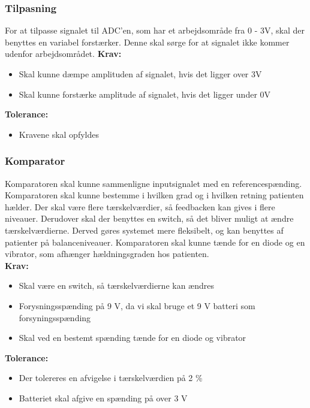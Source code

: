 \subsubsection{Tilpasning}
For at tilpasse signalet til ADC'en, som har et arbejdsområde fra 0 - 3V, skal der benyttes en variabel forstærker. Denne skal sørge for at signalet ikke kommer udenfor arbejdsområdet.
\textbf{Krav:}
\begin{itemize}
\item Skal kunne dæmpe amplituden af signalet, hvis det ligger over 3V
\item Skal kunne forstærke amplitude af signalet, hvis det ligger under 0V
\end{itemize}
\textbf{Tolerance:}
\begin{itemize}
\item Kravene skal opfyldes
\end{itemize}

\subsubsection{Komparator}
Komparatoren skal kunne sammenligne inputsignalet med en referencespænding. Komparatoren skal kunne bestemme i hvilken grad og i hvilken retning patienten hælder. Der skal være flere tærskelværdier, så feedbacken kan gives i flere niveauer. Derudover skal der benyttes en switch, så det bliver muligt at ændre tærskelværdierne. Derved gøres systemet mere fleksibelt, og kan benyttes af patienter på balanceniveauer. Komparatoren skal kunne tænde for en diode og en vibrator, som afhænger hældningsgraden hos patienten. \\
\textbf{Krav:}
\begin{itemize}
\item Skal være en switch, så tærskelværdierne kan ændres
\item Forysningsspænding på 9 V, da vi skal bruge et 9 V batteri som forsyningsspænding
\item Skal ved en bestemt spænding tænde for en diode og vibrator
\end{itemize}
\textbf{Tolerance:}
\begin{itemize}
\item Der tolereres en afvigelse i tærskelværdien på 2 \%
\item Batteriet skal afgive en spænding på over 3 V
\end{itemize}

